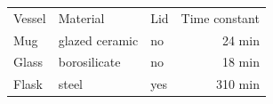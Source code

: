 \begin{tabular}{lllr}
    Vessel & Material & Lid & Time constant \\
    Mug & glazed ceramic & no & 24 min \\
    Glass & borosilicate & no & 18 min \\
    Flask & steel & yes & 310 min \\
\end{tabular}
